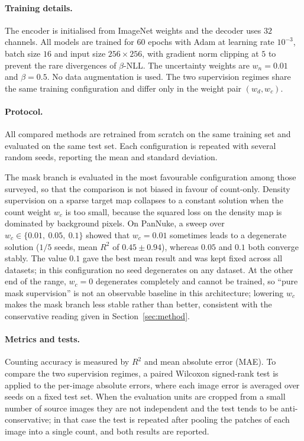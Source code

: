 \documentclass[pdflatex,sn-mathphys-num]{sn-jnl}
\begin{document}
\paragraph{Training details.} The encoder is initialised from ImageNet weights and the decoder uses $32$
channels. All models are trained for $60$ epochs with Adam at learning rate $10^{-3}$, batch size $16$ and
input size $256\times256$, with gradient norm clipping at $5$ to prevent the rare divergences of $\beta$-NLL.
The uncertainty weights are $w_n = 0.01$ and $\beta = 0.5$. No data augmentation is used. The two supervision
regimes share the same training configuration and differ only in the weight pair $(w_d, w_c)$.

\paragraph{Protocol.} All compared methods are retrained from scratch on the same training set and evaluated on
the same test set. Each configuration is repeated with several random seeds, reporting the mean and standard
deviation.

The mask branch is evaluated in the most favourable configuration among those surveyed, so that the comparison
is not biased in favour of count-only. Density supervision on a sparse target map collapses to a constant
solution when the count weight $w_c$ is too small, because the squared loss on the density map is dominated by
background pixels. On PanNuke, a sweep over $w_c \in \{0.01,\ 0.05,\ 0.1\}$ showed that $w_c = 0.01$ sometimes
leads to a degenerate solution ($1/5$ seeds, mean $R^2$ of $0.45 \pm 0.94$), whereas $0.05$ and $0.1$ both
converge stably. The value $0.1$ gave the best mean result and was kept fixed across all datasets; in this
configuration no seed degenerates on any dataset. At the other end of the range, $w_c = 0$ degenerates
completely and cannot be trained, so ``pure mask supervision'' is not an observable baseline in this
architecture; lowering $w_c$ makes the mask branch less stable rather than better, consistent with the
conservative reading given in Section~\ref{sec:method}.

\paragraph{Metrics and tests.} Counting accuracy is measured by $R^2$ and mean absolute error (MAE). To compare
the two supervision regimes, a paired Wilcoxon signed-rank test is applied to the per-image absolute errors,
where each image error is averaged over seeds on a fixed test set. When the evaluation units are cropped from a
small number of source images they are not independent and the test tends to be anti-conservative; in that case
the test is repeated after pooling the patches of each image into a single count, and both results are
reported.
\end{document}
